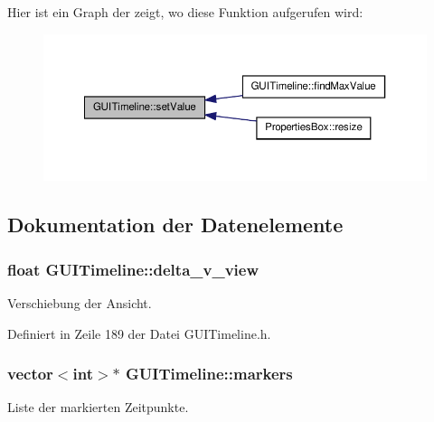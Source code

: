 Hier ist ein Graph der zeigt, wo diese Funktion aufgerufen wird\-:\nopagebreak
\begin{figure}[H]
\begin{center}
\leavevmode
\includegraphics[width=350pt]{classGUITimeline_a0fa4ef5ed2e0fe5f416d9d4c75b86ebc_icgraph}
\end{center}
\end{figure}




\subsection{Dokumentation der Datenelemente}
\hypertarget{classGUITimeline_aba3c330e3e9e5f2f5edb069ecbb9c488}{
\subsubsection[{delta\-\_\-v\-\_\-view}]{\setlength{\rightskip}{0pt plus 5cm}float G\-U\-I\-Timeline\-::delta\-\_\-v\-\_\-view\hspace{0.3cm}{\ttfamily [private]}}}\label{classGUITimeline_aba3c330e3e9e5f2f5edb069ecbb9c488}
Verschiebung der Ansicht. 

Definiert in Zeile 189 der Datei G\-U\-I\-Timeline.\-h.

\hypertarget{classGUITimeline_a8e20b6ed00d7c48716256fffdcfa608a}{
\subsubsection[{markers}]{\setlength{\rightskip}{0pt plus 5cm}vector$<$int$>$$\ast$ G\-U\-I\-Timeline\-::markers\hspace{0.3cm}{\ttfamily [private]}}}\label{classGUITimeline_a8e20b6ed00d7c48716256fffdcfa608a}
Liste der markierten Zeitpunkte. 

